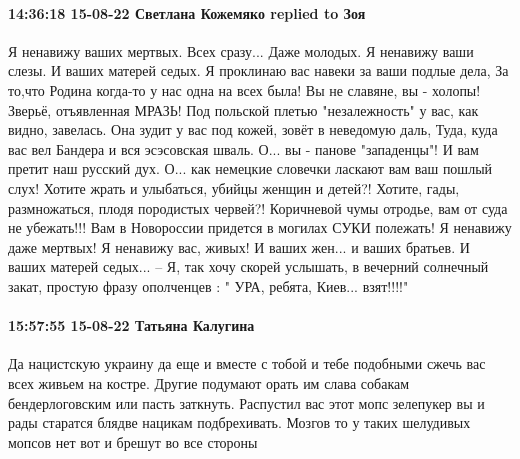  
 
 
 
 

\paragraph{14:36:18 15-08-22 Светлана Кожемяко replied to Зоя}

\obeycr
Я ненавижу ваших мертвых. Всех сразу... Даже молодых.
Я ненавижу ваши слезы. И ваших матерей седых.
Я проклинаю вас навеки за ваши подлые дела,
За то,что Родина когда-то у нас одна на всех была!
Вы не славяне, вы - холопы! Зверьё, отъявленная МРАЗЬ!
Под польской плетью "незалежность" у вас, как видно, завелась.
Она зудит у вас под кожей, зовёт в неведомую даль,
Туда, куда вас вел Бандера и вся эсэсовская шваль.
О... вы - панове "западенцы"! И вам претит наш русский дух.
О... как немецкие словечки ласкают вам ваш пошлый слух!
Хотите жрать и улыбаться, убийцы женщин и детей?!
Хотите, гады, размножаться, плодя породистых червей?!
Коричневой чумы отродье, вам от суда не убежать!!!
Вам в Новороссии придется в могилах СУКИ полежать!
Я ненавижу даже мертвых! Я ненавижу вас, живых!
И ваших жен... и ваших братьев. И ваших матерей седых...
-- Я, так хочу скорей услышать,
в вечерний солнечный закат,
простую фразу ополченцев :
" УРА, ребята, Киев... взят!!!!"
\restorecr

\paragraph{15:57:55 15-08-22 Татьяна Калугина}

Да нацистскую украину да еще и вместе с тобой и тебе подобными сжечь вас всех
живьем на костре. Другие подумают орать им слава собакам бендерлоговским или
пасть заткнуть. Распустил вас этот мопс зелепукер вы и рады старатся блядве
нацикам подбрехивать. Мозгов то у таких шелудивых мопсов нет вот и брешут во
все стороны
